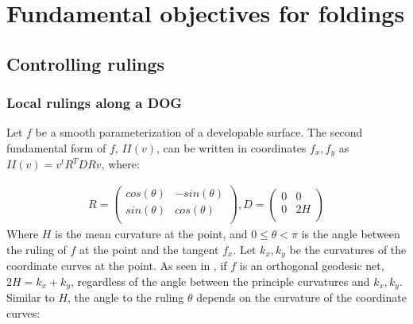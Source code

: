\section{Fundamental objectives for foldings} \label{sec:objectives}


\subsection{Controlling rulings} \label{sec:rulings}
\subsubsection{Local rulings along a DOG} \label{sec:dog_rulings}
Let $f$ be a smooth parameterization of a developable surface. The second fundamental form of $f$, $II(v)$, can be written in coordinates $f_x,f_y$ as  $II(v)=v^tR^TDRv$, where:

\begin{equation} \label{second_smooth}
\begin{split}
R=\begin{pmatrix}cos(\theta) & -sin(\theta)\\
sin(\theta) &  cos(\theta)\\
\end{pmatrix},
D=\begin{pmatrix}0 & 0\\
0 &  2H\\
\end{pmatrix}
\end{split}
\end{equation}
Where $H$ is the mean curvature at the point, and $0 \leq \theta < \pi$ is the angle between the ruling of $f$ at the point and the tangent $f_x$. Let $k_x,k_y$ be the curvatures of the coordinate curves at the point. As seen in \cite{rabi2018shape}, if $f$ is an orthogonal geodesic net, $2H = k_x+k_y$, regardless of the angle between the principle curvatures and $k_x,k_y$. Similar to $H$, the angle to the ruling $\theta$ depends on the curvature of the coordinate curves:

